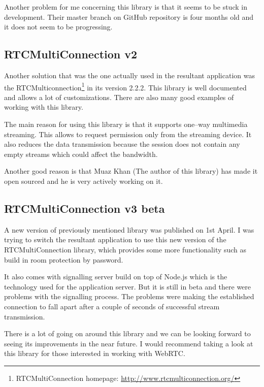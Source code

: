Another problem for me concerning this library is that it seems to be stuck in development. Their master branch on GitHub repository is four months old and it does not seem to be progressing.

\subsection{RTCMultiConnection v2}
Another solution that was the one actually used in the resultant application was the RTCMulticonnection\footnote{RTCMultiConnection homepage: \url{http://www.rtcmulticonnection.org/}} in its version 2.2.2. This library is well documented and allows a lot of customizations. There are also many good examples of working with this library.

The main reason for using this library is that it supports one--way multimedia streaming. This allows to request permission only from the streaming device. It also reduces the data transmission because the session does not contain any empty streams which could affect the bandwidth.

Another good reason is that Muaz Khan (The author of this library) has made it open sourced and he is very actively working on it.

\subsection{RTCMultiConnection v3 beta}
A new version of previously mentioned library was published on 1st April. I was trying to switch the resultant application to use this new version of the RTCMultiConnection library, which provides some more functionality such as build in room protection by password.

It also comes with signalling server build on top of Node.js which is the technology used for the application server. But it is still in beta and there were problems with the signalling process. The problems were making the established connection to fall apart after a couple of seconds of successful stream transmission.

There is a lot of going on around this library and we can be looking forward to seeing its improvements in the near future. I would recommend taking a look at this library for those interested in working with WebRTC.\\
